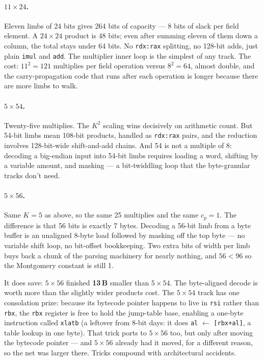 \documentclass[11pt,a4paper]{article}
\newcommand{\bytes}[1]{\textcolor{blue!60!black}{\textbf{#1\,B}}}
\begin{document}
\paragraph{$11 \times 24$.} Eleven limbs of 24 bits gives 264 bits of
capacity --- 8 bits of slack per field element. A $24 \times 24$
product is 48 bits; even after summing eleven of them down a column,
the total stays under 64 bits. No \texttt{rdx:rax} splitting, no
128-bit adds, just plain \texttt{imul} and \texttt{add}. The
multiplier inner loop is the simplest of any track. The cost:
$11^2 = 121$ multiplies per field operation versus $8^2 = 64$, almost
double, and the carry-propagation code that runs after each operation
is longer because there are more limbs to walk.

\paragraph{$5 \times 54$.} Twenty-five multiplies. The $K^2$ scaling
wins decisively on arithmetic count. But 54-bit limbs mean 108-bit
products, handled as \texttt{rdx:rax} pairs, and the reduction
involves 128-bit-wide shift-and-add chains. And 54 is not a multiple of 8:
decoding a big-endian input into 54-bit limbs requires loading a
word, shifting by a variable amount, and masking --- a bit-twiddling
loop that the byte-granular tracks don't need.

\paragraph{$5 \times 56$.} Same $K=5$ as above, so the same 25
multiplies and the same $c_p = 1$. The difference is that 56 bits is
exactly 7 bytes. Decoding a 56-bit limb from a byte buffer is an
unaligned 8-byte load followed by masking off the top byte --- no variable shift
loop, no bit-offset bookkeeping. Two extra bits of width per limb
buys back a chunk of the parsing machinery for nearly nothing, and
$56 < 96$ so the Montgomery constant is still 1.

It does save: $5 \times 56$ finished \bytes{13} smaller than
$5 \times 54$. The byte-aligned decode is worth more than the
slightly wider products cost. The $5 \times 54$ track has one
consolation prize: because its bytecode pointer happens to live in
\texttt{rsi} rather than \texttt{rbx}, the \texttt{rbx} register is
free to hold the jump-table base, enabling a one-byte instruction
called \texttt{xlatb} (a leftover from 8-bit days: it does
\texttt{al} $\leftarrow$ \texttt{[rbx+al]}, a table lookup in one
byte). That
trick ports to $5 \times 56$ too, but only after moving the bytecode
pointer --- and $5 \times 56$ already had it moved, for a different
reason, so the net was larger there. Tricks compound with
architectural accidents.
\end{document}

